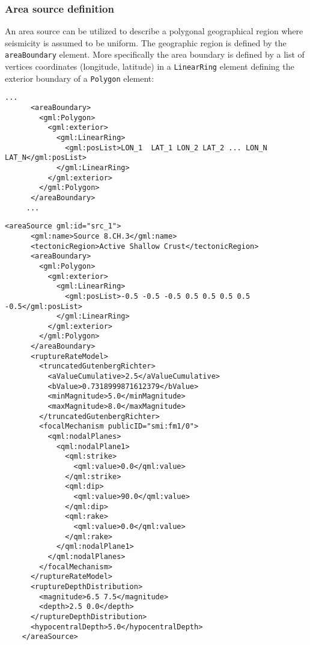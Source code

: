 \subsubsection{Area source definition}
An area source can be utilized to describe a polygonal geographical region where seismicity is assumed to be uniform.
The geographic region is defined by the \Verb+areaBoundary+ element. More specifically the area boundary is defined by a list of vertices coordinates (longitude, latitude) in a \Verb+LinearRing+ element defining the exterior boundary of a \Verb+Polygon+ element:
\begin{Verbatim}[frame=single]
    ...
      <areaBoundary>
        <gml:Polygon>
          <gml:exterior>
            <gml:LinearRing>
              <gml:posList>LON_1  LAT_1 LON_2 LAT_2 ... LON_N LAT_N</gml:posList>
            </gml:LinearRing>
          </gml:exterior>
        </gml:Polygon>
      </areaBoundary>
     ...
\end{Verbatim}
\begin{Verbatim}[frame=single]
    <areaSource gml:id="src_1">
      <gml:name>Source 8.CH.3</gml:name>
      <tectonicRegion>Active Shallow Crust</tectonicRegion>
      <areaBoundary>
        <gml:Polygon>
          <gml:exterior>
            <gml:LinearRing>
              <gml:posList>-0.5 -0.5 -0.5 0.5 0.5 0.5 0.5 -0.5</gml:posList>
            </gml:LinearRing>
          </gml:exterior>
        </gml:Polygon>
      </areaBoundary>
      <ruptureRateModel>
        <truncatedGutenbergRichter>
          <aValueCumulative>2.5</aValueCumulative>
          <bValue>0.7318999871612379</bValue>
          <minMagnitude>5.0</minMagnitude>
          <maxMagnitude>8.0</maxMagnitude>
        </truncatedGutenbergRichter>
        <focalMechanism publicID="smi:fm1/0">
          <qml:nodalPlanes>
            <qml:nodalPlane1>
              <qml:strike>
                <qml:value>0.0</qml:value>
              </qml:strike>
              <qml:dip>
                <qml:value>90.0</qml:value>
              </qml:dip>
              <qml:rake>
                <qml:value>0.0</qml:value>
              </qml:rake>
            </qml:nodalPlane1>
          </qml:nodalPlanes>
        </focalMechanism>
      </ruptureRateModel>
      <ruptureDepthDistribution>
        <magnitude>6.5 7.5</magnitude>
        <depth>2.5 0.0</depth>
      </ruptureDepthDistribution>
      <hypocentralDepth>5.0</hypocentralDepth>
    </areaSource>
\end{Verbatim}

